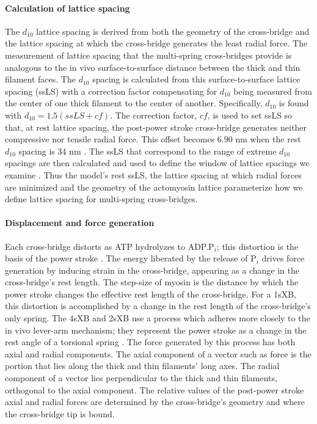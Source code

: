 \documentclass[]{article}
\begin{document}
\paragraph{Calculation of lattice spacing} %
The $d_{10}$ lattice spacing is derived from both the geometry of the cross-bridge and the lattice spacing at which the cross-bridge generates the least radial force. 
The measurement of lattice spacing that the multi-spring cross-bridges provide is analogous to the in vivo surface-to-surface distance between the thick and thin filament faces.
The $d_{10}$ spacing is calculated from this surface-to-surface lattice spacing (ssLS) with a correction factor compensating for $d_{10}$ being measured from the center of one thick filament to the center of another. 
Specifically, $d_{10}$ is found with $d_{10} = 1.5 (ssLS + cf)$. 
The correction factor, $cf$, is used to set ssLS so that, at rest lattice spacing, the post-power stroke cross-bridge generates neither compressive nor tensile radial force.  
This offset becomes 6.90 nm when the rest $d_{10}$ spacing is 34 nm \citep{Brenner1991}. 
The ssLS that correspond to the range of extreme $d_{10}$ spacings are then calculated and used to define the window of lattice spacings we examine \citep{Millman1998}. 
Thus the model's rest ssLS, the lattice spacing at which radial forces are minimized and the geometry of the actomyosin lattice parameterize how we define lattice spacing for multi-spring cross-bridges. 

\paragraph{Displacement and force generation} %
Each cross-bridge distorts as ATP hydrolyzes to ADP.P$_i$; this distortion is the basis of the power stroke \citep{Pate1989, Daniel1998, Tanner2007}. 
The energy liberated by the release of P$_i$ drives force generation by inducing strain in the cross-bridge, appearing as a change in the cross-bridge's rest length.  
The step-size of myosin is the distance by which the power stroke changes the effective rest length of the cross-bridge.  
For a 1sXB, this distortion is accomplished by a change in the rest length of the cross-bridge's only spring. 
The 4sXB and 2sXB use a process which adheres more closely to the in vivo lever-arm mechanism; they represent the power stroke as a change in the rest angle of a torsional spring \citep{Reedy2000}.
The force generated by this process has both axial and radial components. 
The axial component of a vector such as force is the portion that lies along the thick and thin filaments' long axes. 
The radial component of a vector lies perpendicular to the thick and thin filaments, orthogonal to the axial component. 
The relative values of the post-power stroke axial and radial forces are determined by the cross-bridge's geometry and where the cross-bridge tip is bound. 
\end{document}

